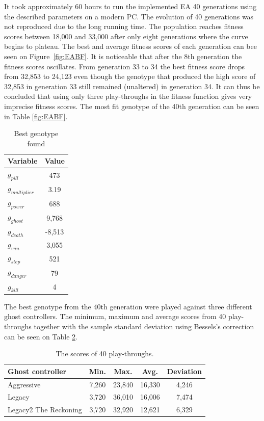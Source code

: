 \documentclass[conference]{IEEEtran}
\begin{document}
It took approximately 60 hours to run the implemented EA 40 generations using the described parameters on a modern PC. The evolution of 40 generations was not reproduced due to the long running time. The population reaches fitness scores between 18,000 and 33,000 after only eight generations where the curve begins to plateau. The best and average fitness scores of each generation can bee seen on Figure~\ref{fig:EABF}. It is noticeable that after the 8th generation the fitness scores oscillates. From generation 33 to 34 the best fitness score drops from 32,853 to 24,123 even though the genotype that produced the high score of 32,853 in generation 33 still remained (unaltered) in generation 34. It can thus be concluded that using only three play-throughs in the fitness function gives very imprecise fitness scores. The most fit genotype of the 40th generation can be seen in Table \ref{fig:EABF}.\\

\begin{table}
\begin{center}
\caption{Best genotype found}
\label{table-best-genotype}
\begin{tabular}{|l|c|}
\hline
Variable    		& Value	\\
\hline
$g_{pill}$ 			& 473\\
\hline
$g_{multiplier}$ 	& 3.19\\
\hline
$g_{power}$ 		& 688\\
\hline
$g_{ghost}$ 		& 9,768\\
\hline
$g_{death}$ 		& -8,513\\
\hline
$g_{win}$ 			& 3,055\\
\hline
$g_{step}$ 			& 521\\
\hline
$g_{danger}$ 		& 79\\
\hline
$g_{kill}$ 			& 4\\
\hline
\end{tabular}
\end{center}
\end{table}

The best genotype from the 40th generation were played against three different ghost controllers. The minimum, maximum and average scores from 40 play-throughs together with the sample standard deviation using Bessels's correction can be seen on Table \ref{GAscores}.

\begin{table}
\begin{center}
\caption{The scores of 40 play-throughs. }
\label{GAscores}
\begin{tabular}{|l|c|c|c|c|}
\hline
Ghost controller & Min. & Max. & Avg. & Deviation \\
\hline
Aggressive & 7,260 & 23,840 & 16,330 & 4,246\\
\hline
Legacy & 3,720 & 36,010 & 16,006 & 7,474\\
\hline
Legacy2 The Reckoning & 3,720 & 32,920 & 12,621 & 6,329\\
\hline
\end{tabular}
\end{center}
\end{table}
\end{document}

